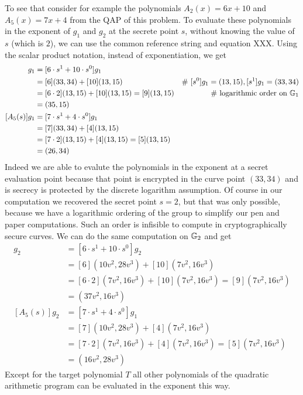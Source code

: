 \begin{example}
To see that consider for example the polynomials $A_2(x)= 6x +10$ and $A_5(x)=7x+4$ from the QAP of this problem. To evaluate these polynomials in the exponent of $g_1$ and $g_2$ at the secrete point $s$, without knowing the value of $s$ (which is $2$), we can use the common reference string and equation XXX. Using the scalar product notation, instead of exponentiation, we get
\begin{align*}
[A_2(s)]g_1 & = [6\cdot s^1 + 10\cdot s^0] g_1 \\
     & = [6](33,34) + [10](13,15) & \text{\# } [s^0]g_1 = (13,15), [s^1]g_1 = (33,34)\\
     & = [6\cdot 2](13,15) + [10](13,15) = [9](13,15) & \text{\# logarithmic order on } \G_1 \\   
     & = (35,15)\\
[A_5(s)]g_1 & = [7\cdot s^1 + 4\cdot s^0] g_1 \\
     & = [7](33,34) + [4](13,15) \\
     & = [7\cdot 2](13,15) + [4](13,15) = [5](13,15)\\
     & = (26,34)     
\end{align*}
Indeed we are able to evalute the polynomials in the exponent at a secret evaluation point because that point is encrypted in the curve point $(33,34)$ and is secrecy is protected by the discrete logarithm assumption. Of course in our computation we recovered the secret point $s=2$, but that was only possible, because we have a logarithmic ordering of the group to simplify our pen and paper computations. Such an order is infisible to compute in cryptographically secure curves. We can do the same computation on $\mathbb{G}_2$ and get
\begin{align*}
[A_2(s)]g_2 & = [6\cdot s^1 + 10\cdot s^0] g_2 \\
     & = [6](10v^2,28v^3) + [10](7v^2,16v^3) \\
     & = [6\cdot 2](7v^2,16v^3) + [10](7v^2,16v^3) = [9](7v^2,16v^3) \\   
     & = (37v^2,16v^3)\\
[A_5(s)]g_2 & = [7\cdot s^1 + 4\cdot s^0] g_1 \\
     & = [7](10v^2,28v^3) + [4](7v^2,16v^3) \\
     & = [7\cdot 2](7v^2,16v^3) + [4](7v^2,16v^3) = [5](7v^2,16v^3)\\
     & = (16v^2,28v^3)     
\end{align*}
Except for the target polynomial $T$ all other polynomials of the quadratic arithmetic program can be evaluated in the exponent this way.
\end{example}
